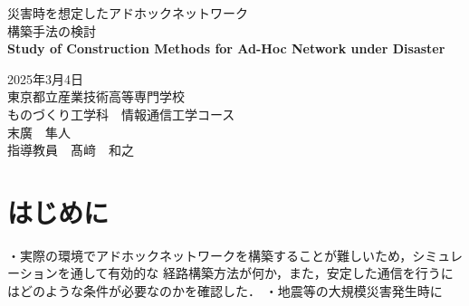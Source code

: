 \documentclass[a4paper, 11pt]{ltjsarticle}
\begin{document}
\fontsize{11pt}{14pt}\selectfont

\thispagestyle{empty}
\begin{center}

\vspace*{40mm}
{\huge\noindent 災害時を想定したアドホックネットワーク}\\
\medskip
{\huge\noindent 構築手法の検討}\\
\vspace{\baselineskip}
{\huge\noindent\textbf{Study of Construction Methods for Ad-Hoc Network under Disaster}}\\
\vspace{120mm}

{\huge\noindent
2025年3月4日\\
東京都立産業技術高等専門学校\\
ものづくり工学科　情報通信工学コース \\
末廣　隼人\\
指導教員　髙﨑　和之    \\
}
\vspace{40mm}

\end{center}

\clearpage  %
\thispagestyle{empty}
\tableofcontents  %

\clearpage
{}
\section{はじめに}

・実際の環境でアドホックネットワークを構築することが難しいため，シミュレーションを通して有効的な
経路構築方法が何か，また，安定した通信を行うにはどのような条件が必要なのかを確認した．
・地震等の大規模災害発生時に
\end{document}
